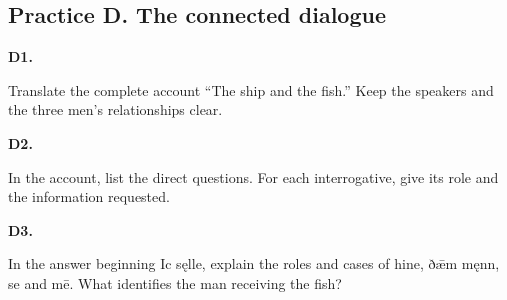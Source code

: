 \par\begin{minipage}{\linewidth}\raggedright
{}
\end{minipage}\par

\subsection*{Practice D. The connected dialogue}

\par\begin{minipage}{\linewidth}\raggedright
\textbf{D1.}

Translate the complete account “The ship and the fish.” Keep the speakers and the three men’s relationships clear.

\end{minipage}\par\addvspace{4pt}

\par\begin{minipage}{\linewidth}\raggedright
\textbf{D2.}

In the account, list the direct questions. For each interrogative, give its role and the information requested.

\end{minipage}\par\addvspace{4pt}

\par\begin{minipage}{\linewidth}\raggedright
\textbf{D3.}

In the answer beginning Ic sęlle, explain the roles and cases of hine, ðǣm męnn, se and mē. What identifies the man receiving the fish?

\end{minipage}\par\addvspace{4pt}

